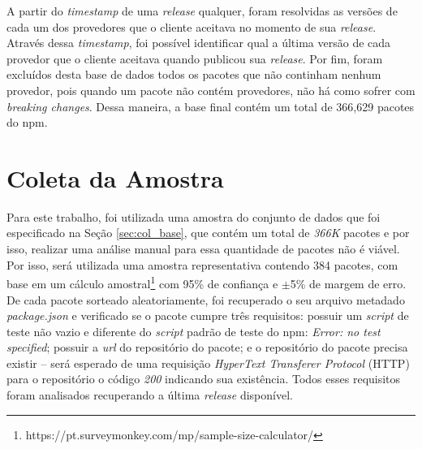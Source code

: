 A partir do \textit{timestamp} de uma \textit{release} qualquer, foram resolvidas as versões de cada um dos provedores que o cliente aceitava no momento de sua \textit{release}. Através dessa \textit{timestamp}, foi possível identificar qual a última versão de cada provedor que o cliente aceitava quando publicou sua \textit{release}. Por fim, foram excluídos desta base de dados todos os pacotes que não continham nenhum provedor, pois quando um pacote não contém provedores, não há como sofrer com \textit{breaking changes}. Dessa maneira, a base final contém um total de 366,629 pacotes do \gls{npm}.

\section{Coleta da Amostra}
\label{sec:col_amostra}
Para este trabalho, foi utilizada uma amostra do conjunto de dados que foi especificado na Seção \ref{sec:col_base}, que contém um total de \textit{366K} pacotes e por isso, realizar uma análise manual para essa quantidade de pacotes não é viável. Por isso, será utilizada uma amostra representativa contendo 384 pacotes, com base em um cálculo amostral\footnote{https://pt.surveymonkey.com/mp/sample-size-calculator/} com 95\% de confiança e $\pm$5\% de margem de erro. De cada pacote sorteado aleatoriamente, foi recuperado o seu arquivo metadado \textit{package.json} e verificado se o pacote cumpre três requisitos: possuir um \textit{script} de teste não vazio e diferente do \textit{script} padrão de teste do \gls{npm}: \textit{Error: no test specified}; possuir a \textit{url} do repositório do pacote; e o repositório do pacote precisa existir -- será esperado de uma requisição \textit{HyperText Transferer Protocol} (HTTP) para o repositório o código \textit{200} indicando sua existência. Todos esses requisitos foram analisados recuperando a última \textit{release} disponível.

